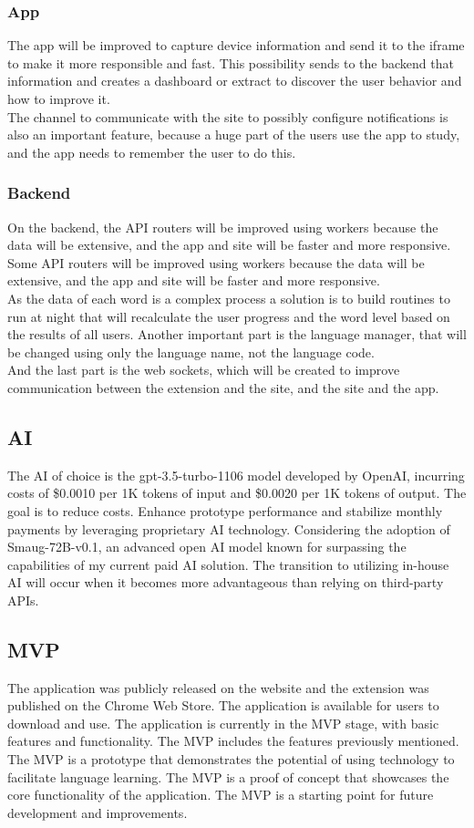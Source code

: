 \documentclass[12pt]{article}
\begin{document}
\subsubsection{App}
The app will be improved to capture device information and send it to the iframe to make it more responsible and fast. This possibility sends to the backend that information and creates a dashboard or extract to discover the user behavior and how to improve it. \\
The channel to communicate with the site to possibly configure notifications is also an important feature, because a huge part of the users use the app to study, and the app needs to remember the user to do this. 
\subsubsection{Backend} 
On the backend, the API routers will be improved using workers because the data will be extensive, and the app and site will be faster and more responsive. \\
Some API routers will be improved using workers because the data will be extensive, and the app and site will be faster and more responsive. \\
As the data of each word is a complex process a solution is to build routines to run at night that will recalculate the user progress and the word level based on the results of all users.
Another important part is the language manager, that will be changed using only the language name, not the language code. \\
And the last part is the web sockets, which will be created to improve communication between the extension and the site, and the site and the app. 

\subsection{AI}
The AI of choice is the gpt-3.5-turbo-1106 model developed by OpenAI, incurring costs of \$0.0010 per 1K tokens of input and \$0.0020 per 1K tokens of output. The goal is to reduce costs. Enhance prototype performance and stabilize monthly payments by leveraging proprietary AI technology. Considering the adoption of Smaug-72B-v0.1, an advanced open AI model known for surpassing the capabilities of my current paid AI solution. The transition to utilizing in-house AI will occur when it becomes more advantageous than relying on third-party APIs.
\subsection{MVP}
The application was publicly released on the website and the extension was published on the Chrome Web Store. The application is available for users to download and use. The application is currently in the MVP stage, with basic features and functionality. The MVP includes the features previously mentioned. \\
The MVP is a prototype that demonstrates the potential of using technology to facilitate language learning. The MVP is a proof of concept that showcases the core functionality of the application. The MVP is a starting point for future development and improvements. 
\end{document}
